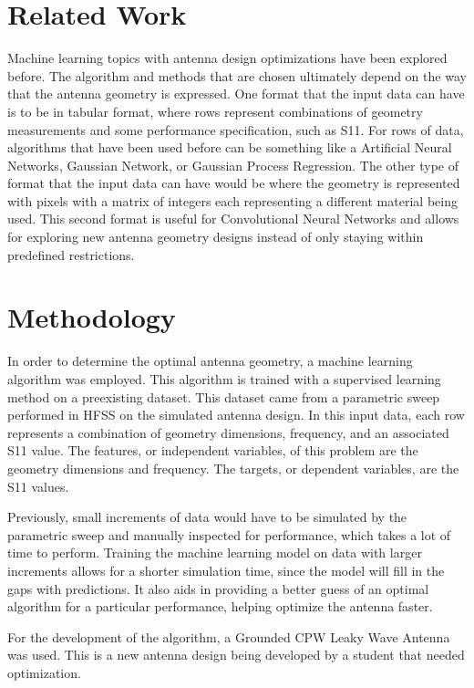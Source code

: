 \documentclass[lettersize,journal]{IEEEtran}
\begin{document}
\section{Related Work}
Machine learning topics with antenna design optimizations have been explored before. The algorithm and methods that are chosen ultimately depend on the way that the antenna geometry is expressed. One format that the input data can have is to be in tabular format, where rows represent combinations of geometry measurements and some performance specification, such as S11. For rows of data, algorithms that have been used before can be something like a Artificial Neural Networks, Gaussian Network, or Gaussian Process Regression. The other type of format that the input data can have would be where the geometry is represented with pixels with a matrix of integers each representing a different material being used. This second format is useful for Convolutional Neural Networks and allows for exploring new antenna geometry designs instead of only staying within predefined restrictions.~\cite{wu_machine_2023} 


\section{Methodology}
In order to determine the optimal antenna geometry, a machine learning algorithm was employed. This algorithm is trained with a supervised learning method on a preexisting dataset. This dataset came from a parametric sweep performed in HFSS on the simulated antenna design. In this input data, each row represents a combination of geometry dimensions, frequency, and an associated S11 value. The features, or independent variables, of this problem are the geometry dimensions and frequency. The targets, or dependent variables, are the S11 values. 

Previously, small increments of data would have to be simulated by the parametric sweep and manually inspected for performance, which takes a lot of time to perform. Training the machine learning model on data with larger increments allows for a shorter simulation time, since the model will fill in the gaps with predictions. It also aids in providing a better guess of an optimal algorithm for a particular performance, helping optimize the antenna faster. 

For the development of the algorithm, a Grounded CPW Leaky Wave Antenna was used. This is a new antenna design being developed by a student that needed optimization.
\end{document}
